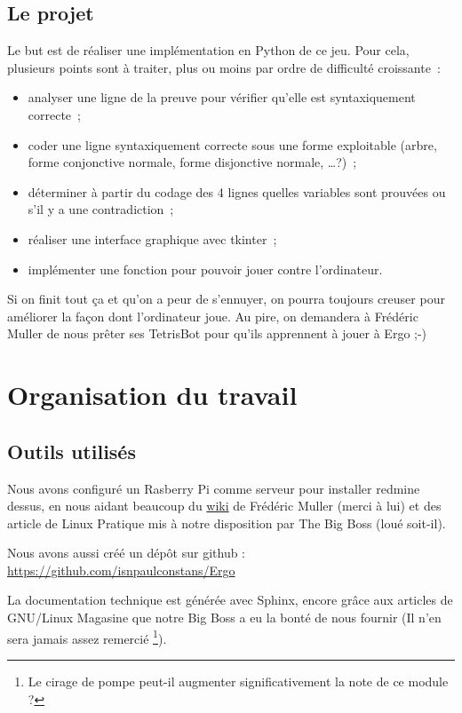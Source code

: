 \documentclass[12pt, algo]{cours}
\begin{document}
\subsection{Le projet}

Le but est de réaliser une implémentation en Python de ce jeu. Pour cela, plusieurs points sont à traiter, plus ou moins par ordre de difficulté croissante~:
\nopagebreak
\begin{itemize}
\item analyser une ligne de la preuve pour vérifier qu'elle est syntaxiquement correcte~;
\item coder une ligne syntaxiquement correcte sous une forme exploitable (arbre, forme conjonctive normale, forme disjonctive normale, \dots ?)~;
\item déterminer à partir du codage des 4 lignes quelles variables sont prouvées ou s'il y a une contradiction~;
\item réaliser une interface graphique avec tkinter~;
\item implémenter une fonction pour pouvoir jouer contre l'ordinateur.
\end{itemize}

Si on finit tout ça et qu'on a peur de s'ennuyer, on pourra toujours creuser pour améliorer la façon dont l'ordinateur joue. Au pire, on demandera à Frédéric Muller de nous prêter ses TetrisBot pour qu'ils apprennent à jouer à Ergo ;-)


\section{Organisation du travail}

\subsection{Outils utilisés}

Nous avons configuré un Rasberry Pi comme serveur pour installer redmine dessus, en nous aidant beaucoup du \href{http://juramaths.fr/redmine/projects/serveur-web-sur-un-raspberry-pi/wiki}{wiki} de Frédéric Muller (merci à lui) et des article de Linux Pratique mis à notre disposition par The Big Boss (loué soit-il).

Nous avons aussi créé un dépôt sur github : \url{https://github.com/isnpaulconstans/Ergo}

La documentation technique est générée avec Sphinx, encore grâce aux articles de GNU/Linux Magasine que notre Big Boss a eu la bonté de nous fournir (Il n'en sera jamais assez remercié \footnote{Le cirage de pompe peut-il augmenter significativement la note de ce module ?}).
\end{document}
